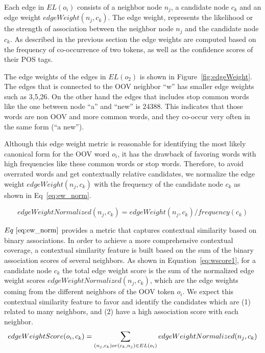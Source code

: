 \documentclass[a4paper,onesided,12pt]{report}
\begin{document}
Each edge in $EL(o_i)$ consists of a neighbor node $n_j$, a candidate node $c_k$ and an edge weight $edgeWeight(n_j,c_k)$. The edge weight, represents the likelihood or the strength of association between the neighbor node $n_j$ and the candidate node $c_k$. As described in the previous section the edge weights are computed based on the frequency of co-occurrence of two tokens, as well as the confidence scores of their POS tags.

The edge weights of the edges in $EL(o_2)$ is shown in Figure~\ref{fig:edgeWeight}. The edges that is connected to the OOV neighbor ``w'' has smaller edge weights such as 3,5,26. On the other hand the edges that includes stop common words like the one between node ``a'' and ``new'' is 24388. This indicates that those words are non OOV and more common words, and they co-occur very often in the same form (``a new'').

Although this edge weight metric is reasonable for identifying the most likely canonical form for the OOV word $o_i$, it has the drawback of favoring words with high frequencies like these common words or stop words. Therefore, to avoid overrated words and get contextually relative candidates, we normalize the edge weight $edgeWeight(n_j,c_k)$ with the frequency of the candidate node $c_k$ as shown in Eq~\ref{eq:ew_norm}.

\begin{equation}
edgeWeightNormalized(n_j,c_k) = edgeWeight(n_j,c_k) / frequency(c_k)
\label{eq:ew_norm}
\end{equation}

$Eq~\ref{eq:ew_norm}$ provides a metric that captures contextual similarity based on binary associations.
In order to achieve a more comprehensive contextual coverage, a contextual similarity feature is built based on the sum of the binary association scores of several neighbors. As shown in Equation~\ref{eq:wscore1}, for a candidate node $c_k$ the total edge weight score is the sum of the normalized edge weight scores $edgeWeightNormalized(n_j,c_k)$, which are the edge weights coming from the different neighbors of the OOV token $o_i$. We expect this contextual similarity feature to favor and identify the candidates which are (1) related to many neighbors, and (2) have a high association score with each neighbor.
\begin{equation}
edgeWeightScore(o_i,c_k) = \sum_{(n_j,c_k) or (c_k,n_j) \in EL(o_i)}{edgeWeightNormalized(n_j,c_k)} \\\\
\label{eq:wscore1}
\end{equation}
\end{document}
